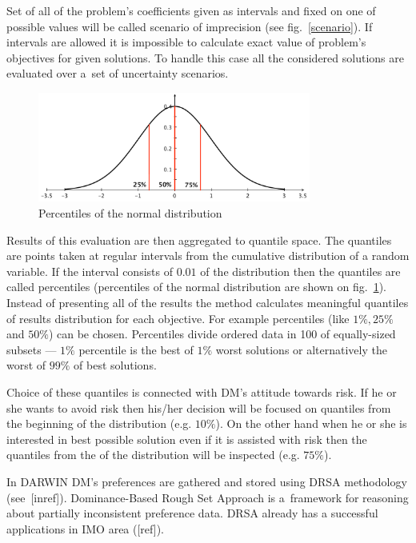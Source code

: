 Set of all of the problem's coefficients given as intervals and fixed on one
of possible values will be called scenario of imprecision (see
fig.~\ref{scenario}). If intervals are allowed it is impossible to calculate
exact value of problem's objectives for given solutions. To handle this case
all the considered solutions are evaluated over a~set of uncertainty
scenarios.

\begin{figure}
  \centering \includegraphics[width=0.8\textwidth]{img/percentile}
  \caption{Percentiles of the normal distribution}
  \label{percentiles}
\end{figure}

 Results of this evaluation are then aggregated to quantile space. The
 quantiles are points taken at regular intervals from the cumulative
 distribution of a random variable. If the interval consists of $0.01$ of the
 distribution then the quantiles are called percentiles (percentiles of the
 normal distribution are shown on fig.~\ref{percentiles}). Instead of
 presenting all of the results the method calculates meaningful quantiles of
 results distribution for each objective. For example percentiles (like $1\%,
 25\%$ and $50\%$) can be chosen. Percentiles divide ordered data in 100 of
 equally-sized subsets --- $1\%$ percentile is the best of $1\%$ worst
 solutions or alternatively the worst of $99\%$ of best solutions.

Choice of these quantiles is connected with DM's attitude towards risk. If he
or she wants to avoid risk then his/her decision will be focused on quantiles
from the beginning of the distribution (e.g. $10\%$). On the other hand when
he or she is interested in best possible solution even if it is assisted with
risk then the quantiles from the of the distribution will be inspected
(e.g. $75\%$). 

In DARWIN DM's preferences are gathered and stored using DRSA methodology
(see~[inref]). Dominance-Based Rough Set Approach is a~framework for reasoning
about partially inconsistent preference data. DRSA already has a successful
applications in IMO area ([ref]).

